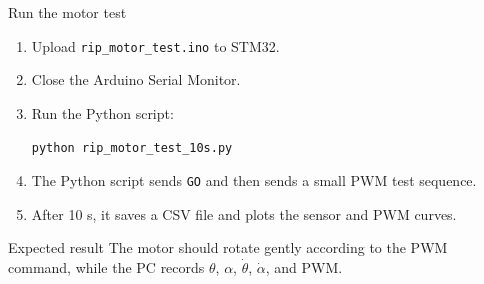 \documentclass[aspectratio=169]{beamer}
\begin{document}
\begin{frame}{Run the motor test}

\begin{enumerate}
    \item Upload \texttt{rip\_motor\_test.ino} to STM32.
    \vspace{0.25cm}

    \item Close the Arduino Serial Monitor.
    \vspace{0.25cm}

    \item Run the Python script:
    \vspace{0.1cm}

    \begin{center}
    \texttt{python rip\_motor\_test\_10s.py}
    \end{center}

    \vspace{0.2cm}

    \item The Python script sends \texttt{GO} and then sends a small PWM test sequence.
    \vspace{0.25cm}

    \item After 10 s, it saves a CSV file and plots the sensor and PWM curves.
\end{enumerate}

\vspace{0.2cm}

\begin{block}{Expected result}
\small
The motor should rotate gently according to the PWM command, while the PC records
$\theta$, $\alpha$, $\dot{\theta}$, $\dot{\alpha}$, and PWM.
\end{block}

\end{frame}
\end{document}
